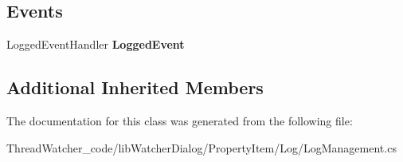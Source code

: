 \subsection*{Events}
\begin{DoxyCompactItemize}
\item 
\hypertarget{classlib_watcher_dialog_1_1_property_item_1_1_log_1_1_log_management_a7a7856b4538fe9a1f70395a783ca14f8}{Logged\+Event\+Handler {\bfseries Logged\+Event}}\label{classlib_watcher_dialog_1_1_property_item_1_1_log_1_1_log_management_a7a7856b4538fe9a1f70395a783ca14f8}

\end{DoxyCompactItemize}
\subsection*{Additional Inherited Members}


The documentation for this class was generated from the following file\+:\begin{DoxyCompactItemize}
\item 
Thread\+Watcher\+\_\+code/lib\+Watcher\+Dialog/\+Property\+Item/\+Log/Log\+Management.\+cs\end{DoxyCompactItemize}
